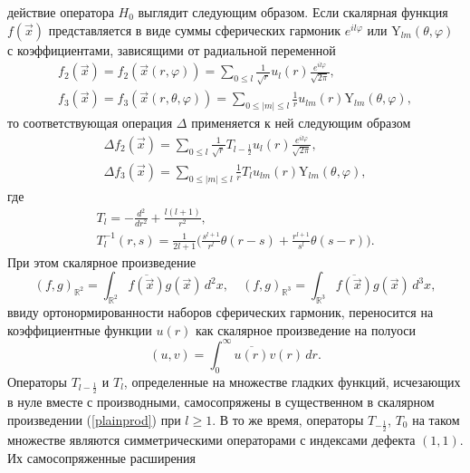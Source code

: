 \documentclass[12pt]{article}
\newcommand{\ol}{\overline}
\newcommand{\RR}{\mathbb{R}}
\newcommand{\YY}{\mathrm{Y}}
\begin{document}
    действие оператора
$ H_{0} $
    выглядит следующим образом. Если скалярная функция
$ f(\vec{x}) $
    представляется в виде суммы сферических гармоник
$ e^{il\varphi} $ или
$ \YY_{lm}(\theta,\varphi) $
    с коэффициентами, зависящими от радиальной переменной
\begin{gather*}
    f_{2}(\vec{x}) = f_{2}(\vec{x}(r,\varphi)) = \sum_{0\leq l}
    \frac{1}{\sqrt{r}} u_{l}(r)
        \frac{e^{il\varphi}}{\sqrt{2\pi}} , \\
    f_{3}(\vec{x}) = f_{3}(\vec{x}(r,\theta,\varphi)) = \sum_{0\leq |m| \leq l}
    \frac{1}{r} u_{lm}(r)
        \YY_{lm}(\theta,\varphi) , 
\end{gather*}
    то соответствующая операция
$ \Delta $
    применяется к ней следующим образом
\begin{gather*}
    \Delta f_{2}(\vec{x})
        = \sum_{0\leq l} \frac{1}{\sqrt{r}}T_{l-\frac{1}{2}} u_{l}(r)
	    \frac{e^{il\varphi}}{\sqrt{2\pi}} , \\
    \Delta f_{3}(\vec{x})
        = \sum_{0\leq |m| \leq l} \frac{1}{r}T_{l} u_{lm}(r)
	\YY_{lm}(\theta,\varphi) ,
\end{gather*}
    где
\begin{gather}
\label{Tl}
    T_{l} = -\frac{d^{2}}{dr^{2}} + \frac{l(l+1)}{r^{2}} ,\\
\nonumber
    T_{l}^{-1}(r,s) = \frac{1}{2l+1}\bigl(\frac{s^{l+1}}{r^{l}} \theta(r-s)
	+ \frac{r^{l+1}}{s^{l}}\theta(s-r)\bigr).
\end{gather}
    При этом скалярное произведение
\begin{equation*}
    (f,g)_{\RR^{2}} = \int_{\RR^{2}} \ol{f(\vec{x})} g(\vec{x}) \,d^{2}x ,
\quad
    (f,g)_{\RR^{3}} = \int_{\RR^{3}} \ol{f(\vec{x})} g(\vec{x}) \,d^{3}x ,
\end{equation*}
    ввиду ортонормированности наборов сферических гармоник,
    переносится на коэффициентные функции
$ u(r) $
    как скалярное произведение на полуоси
\begin{equation}
\label{plainprod}
    (u,v) = \int_{0}^{\infty} \ol{u(r)} v(r) \, dr .
\end{equation}
    Операторы
$ T_{l-\frac{1}{2}} $ и
$ T_{l} $,
    определенные
    на множестве гладких функций,
    исчезающих в нуле вместе с производными,
    самосопряжены в существенном в скалярном произведении
(\ref{plainprod})
    при
$ l \geq 1 $.
    В то же время, операторы
$ T_{-\frac{1}{2}} $,
$ T_{0} $
    на таком множестве являются симметрическими операторами с индексами
    дефекта
$ (1,1) $.
    Их самосопряженные расширения
\end{document}
